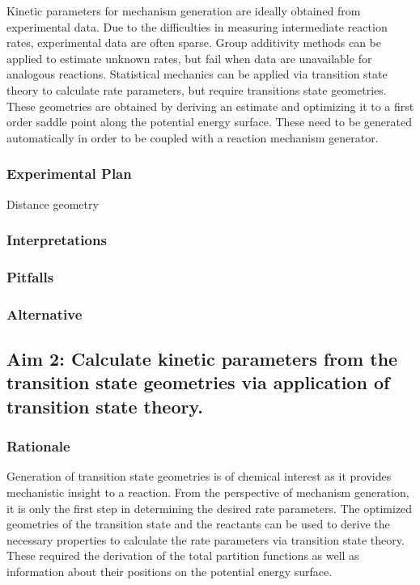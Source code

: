 \documentclass[12pt]{article}
\begin{document}
Kinetic parameters for mechanism generation are ideally obtained from experimental data. Due to the difficulties in measuring intermediate reaction rates, experimental data are often sparse. Group additivity methods can be applied to estimate unknown rates, but fail when data are unavailable for analogous reactions. Statistical mechanics can be applied via transition state theory to calculate rate parameters, but require transitions state geometries. These geometries are obtained by deriving an estimate and optimizing it to a first order saddle point along the potential energy surface. These need to be generated automatically in order to be coupled with a reaction mechanism generator.

\subsubsection{Experimental Plan}

Distance geometry 

\subsubsection{Interpretations}
\subsubsection{Pitfalls}
\subsubsection{Alternative}

\subsection{Aim 2: Calculate kinetic parameters from the transition state geometries via application of transition state theory.}
\subsubsection{Rationale}

Generation of transition state geometries is of chemical interest as it provides mechanistic insight to a reaction. From the perspective of mechanism generation, it is only the first step in determining the desired rate parameters. The optimized geometries of the transition state and the reactants can be used to derive the necessary properties to calculate the rate parameters via transition state theory. These required the derivation of the total partition functions as well as information about their positions on the potential energy surface.
\end{document}
